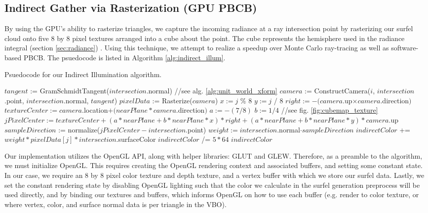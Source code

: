 \subsection{Indirect Gather via Rasterization (GPU PBCB)}
\label{sec:indirect}
By using the GPU's ability to rasterize triangles, we capture the incoming radiance at a ray intersection point by rasterizing our surfel cloud onto five 8 by 8 pixel textures arranged into a cube about the point. The cube represents the hemisphere used in the radiance integral (section \ref{sec:radiance}) . Using this technique, we attempt to realize a speedup over Monte Carlo ray-tracing as well as software-based PBCB. The psuedocode is listed in Algorithm \ref{alg:indirect_illum}.

\begin{algorithm}
\captionfont
\caption[Indirect Illumination]{Psuedocode for our Indirect Illumination algorithm.}
\label{alg:indirect_illum}
{\fontsize{10}{9}\selectfont
\begin{algorithmic}
      \State $tangent$ := GramSchmidtTangent($intersection$.normal) //see alg. \ref{alg:unit_world_xform}
         \State $camera$ := ConstructCamera($i$, $intersection$.point, $intersection$.normal, $tangent$)
         \State $pixelData$ := Rasterize($camera$)
            \State $x := j$ \% $8$
            \State $y := j$ / $8$
            \State $right := -(camera.$up$ \times camera.$direction$)$
            \State $textureCenter := camera.$location$ + (nearPlane * camera.$direction$)$
            \State $a := -(7/8)$
            \State $b := 1/4$
            \State //see fig. \ref{fig:cubemap_texture}
            \State $jPixelCenter := textureCenter + (a*nearPlane + b*nearPlane*x)*right + (a*nearPlane + b*nearPlane*y)*camera.$up
            \State $sampleDirection$ := normalize($jPixelCenter - intersection.$point)
            \State $weight := intersection$.normal$ \cdot sampleDirection$
            \State $indirectColor$ += $weight * pixelData[j] * intersection$.surfaceColor
         \EndFor
      \EndFor
      \State $indirectColor$ /= $5 * 64$
      \State \Return $indirectColor$
   \EndFunction
\end{algorithmic}
}
\end{algorithm}

Our implementation utilizes the OpenGL API, along with helper libraries: GLUT and GLEW. Therefore, as a preamble to the algorithm, we must initialize OpenGL. This requires creating the OpenGL rendering context and associated buffers, and setting some constant state. In our case, we require an 8 by 8 pixel color texture and depth texture, and a vertex buffer with which we store our surfel data. Lastly, we set the constant rendering state by disabling OpenGL lighting such that the color we calculate in the surfel generation preprocess will be used directly, and by binding our textures and buffers, which informs OpenGL on how to use each buffer (e.g. render to color texture, or where vertex, color, and surface normal data is per triangle in the VBO).


